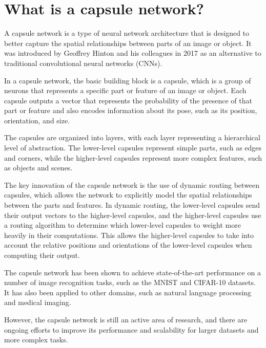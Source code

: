 \section{What is a capsule network?}
A capsule network is a type of neural network architecture that is designed to better capture the spatial relationships between parts of an image or object. It was introduced by Geoffrey Hinton and his colleagues in 2017 as an alternative to traditional convolutional neural networks (CNNs).

In a capsule network, the basic building block is a capsule, which is a group of neurons that represents a specific part or feature of an image or object. Each capsule outputs a vector that represents the probability of the presence of that part or feature and also encodes information about its pose, such as its position, orientation, and size.

The capsules are organized into layers, with each layer representing a hierarchical level of abstraction. The lower-level capsules represent simple parts, such as edges and corners, while the higher-level capsules represent more complex features, such as objects and scenes.

The key innovation of the capsule network is the use of dynamic routing between capsules, which allows the network to explicitly model the spatial relationships between the parts and features. In dynamic routing, the lower-level capsules send their output vectors to the higher-level capsules, and the higher-level capsules use a routing algorithm to determine which lower-level capsules to weight more heavily in their computations. This allows the higher-level capsules to take into account the relative positions and orientations of the lower-level capsules when computing their output.

The capsule network has been shown to achieve state-of-the-art performance on a number of image recognition tasks, such as the MNIST and CIFAR-10 datasets. It has also been applied to other domains, such as natural language processing and medical imaging.

However, the capsule network is still an active area of research, and there are ongoing efforts to improve its performance and scalability for larger datasets and more complex tasks.

